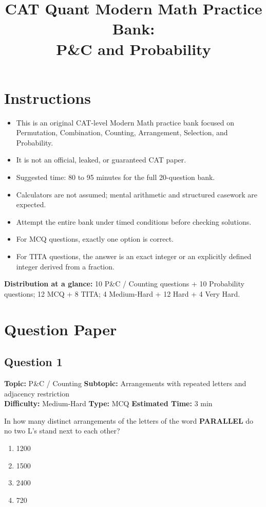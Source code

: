 \documentclass[11pt,a4paper]{article}
\title{\textbf{CAT Quant Modern Math Practice Bank: \\ P\&C and Probability}}
\author{}
\date{}
\begin{document}
\maketitle

\section*{Instructions}

\begin{itemize}[leftmargin=*,itemsep=2pt]
    \item This is an original CAT-level Modern Math practice bank focused on Permutation, Combination, Counting, Arrangement, Selection, and Probability.
    \item It is not an official, leaked, or guaranteed CAT paper.
    \item Suggested time: 80 to 95 minutes for the full 20-question bank.
    \item Calculators are not assumed; mental arithmetic and structured casework are expected.
    \item Attempt the entire bank under timed conditions before checking solutions.
    \item For MCQ questions, exactly one option is correct.
    \item For TITA questions, the answer is an exact integer or an explicitly defined integer derived from a fraction.
\end{itemize}

\vspace{4pt}

\textbf{Distribution at a glance:} 10 P\&C / Counting questions + 10 Probability questions; 12 MCQ + 8 TITA; 4 Medium-Hard + 12 Hard + 4 Very Hard.

\newpage

\section*{Question Paper}

\subsection*{Question 1}
\textbf{Topic:} P\&C / Counting \quad
\textbf{Subtopic:} Arrangements with repeated letters and adjacency restriction \\
\textbf{Difficulty:} Medium-Hard \quad
\textbf{Type:} MCQ \quad
\textbf{Estimated Time:} 3 min
\begin{tcolorbox}[qbox]
In how many distinct arrangements of the letters of the word \textbf{PARALLEL} do no two L's stand next to each other?
\end{tcolorbox}
\begin{enumerate}[label=(\Alph*)]
\item 1200
\item 1500
\item 2400
\item 720
\end{enumerate}
\end{document}
